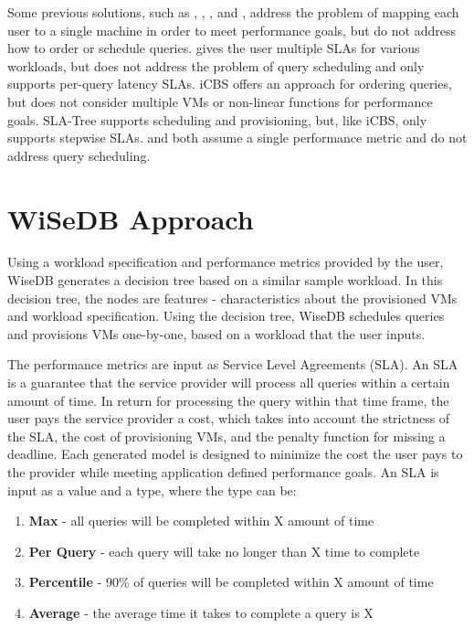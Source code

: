 \documentclass{brandiss}
\numberwithin{section}{chapter}
\numberwithin{figure}{chapter}
\theoremstyle{definition}
\theoremstyle{plain}
\theoremstyle{remark}
\begin{document}
Some previous solutions, such as \cite{delphi_pythia}, \cite{slos}, \cite{pmax}, and \cite{cloudoptimizer}, address the problem of mapping each user to a single machine in order to meet performance goals, but do not address how to order or schedule queries. \cite{pslas} gives the user multiple SLAs for various workloads, but does not address the problem of query scheduling and only supports per-query latency SLAs. iCBS \cite{icbs} offers an approach for ordering queries, but does not consider multiple VMs or non-linear functions for performance goals. SLA-Tree \cite{sla-tree} supports scheduling and provisioning, but, like iCBS, only supports stepwise SLAs. \cite{sqlvm} and \cite{bazaar} both assume a single performance metric and do not address query scheduling.

\section{WiSeDB Approach}

Using a workload specification and performance metrics provided by the user, WiseDB generates a decision tree based on a similar sample workload. In this decision tree, the nodes are features - characteristics about the provisioned VMs and workload specification. Using the decision tree, WiseDB schedules queries and provisions VMs one-by-one, based on a workload that the user inputs.

The performance metrics are input as Service Level Agreements (SLA). An SLA is a guarantee that the service provider will process all queries within a certain amount of time. In return for processing the query within that time frame, the user pays the service provider a cost, which takes into account the strictness of the SLA, the cost of provisioning VMs, and the penalty function for missing a deadline. Each generated model is designed to minimize the cost the user pays to the provider while meeting application defined performance goals. An SLA is input as a value and a type, where the type can be:

\begin{enumerate}
\item \textbf{Max} - all queries will be completed within X amount of time
\item \textbf{Per Query} - each query will take no longer than X time to complete
\item \textbf{Percentile} - 90\% of queries will be completed within X amount of time
\item \textbf{Average} - the average time it takes to complete a query is X
\end{enumerate}
\end{document}
